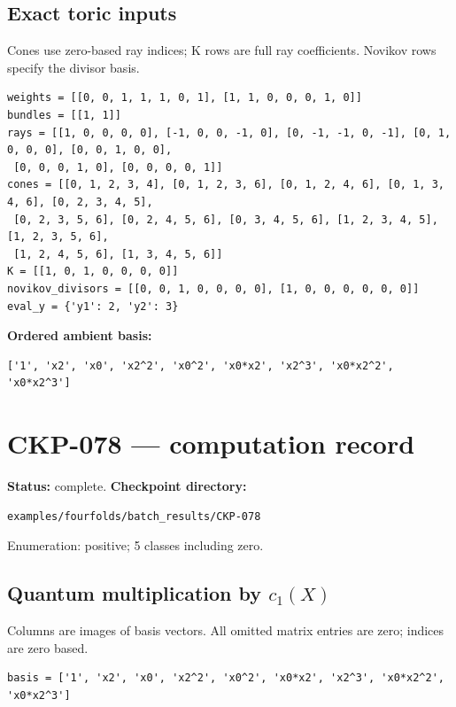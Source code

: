 \documentclass[10pt,a4paper]{article}
\begin{document}
\subsection*{Exact toric inputs}
Cones use zero-based ray indices; K rows are full ray coefficients. Novikov rows specify the divisor basis.

\begin{lstlisting}
weights = [[0, 0, 1, 1, 1, 0, 1], [1, 1, 0, 0, 0, 1, 0]]
bundles = [[1, 1]]
rays = [[1, 0, 0, 0, 0], [-1, 0, 0, -1, 0], [0, -1, -1, 0, -1], [0, 1, 0, 0, 0], [0, 0, 1, 0, 0],
 [0, 0, 0, 1, 0], [0, 0, 0, 0, 1]]
cones = [[0, 1, 2, 3, 4], [0, 1, 2, 3, 6], [0, 1, 2, 4, 6], [0, 1, 3, 4, 6], [0, 2, 3, 4, 5],
 [0, 2, 3, 5, 6], [0, 2, 4, 5, 6], [0, 3, 4, 5, 6], [1, 2, 3, 4, 5], [1, 2, 3, 5, 6],
 [1, 2, 4, 5, 6], [1, 3, 4, 5, 6]]
K = [[1, 0, 1, 0, 0, 0, 0]]
novikov_divisors = [[0, 0, 1, 0, 0, 0, 0], [1, 0, 0, 0, 0, 0, 0]]
eval_y = {'y1': 2, 'y2': 3}
\end{lstlisting}

\textbf{Ordered ambient basis:}
\begin{lstlisting}
['1', 'x2', 'x0', 'x2^2', 'x0^2', 'x0*x2', 'x2^3', 'x0*x2^2', 'x0*x2^3']
\end{lstlisting}

\clearpage\section*{CKP-078 --- computation record}
\textbf{Status:} complete.
\textbf{Checkpoint directory:}
\begin{lstlisting}
examples/fourfolds/batch_results/CKP-078
\end{lstlisting}

Enumeration: positive; 5 classes including zero.
\subsection*{Quantum multiplication by $c_1(X)$}
Columns are images of basis vectors. All omitted matrix entries are zero; indices are zero based.

\begin{lstlisting}
basis = ['1', 'x2', 'x0', 'x2^2', 'x0^2', 'x0*x2', 'x2^3', 'x0*x2^2', 'x0*x2^3']
\end{lstlisting}
\end{document}
